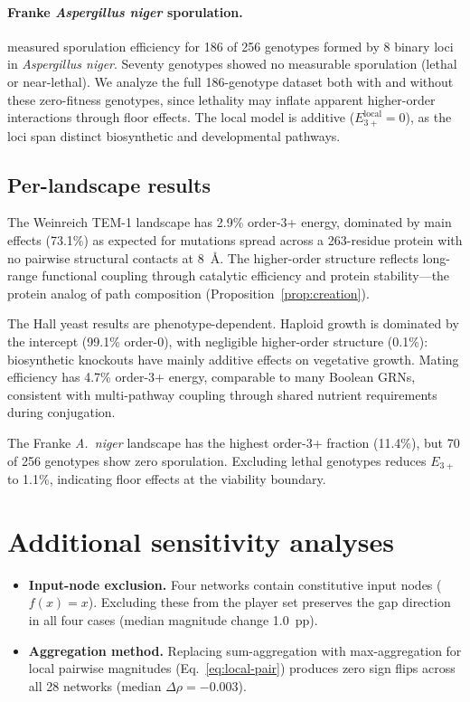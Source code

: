 \documentclass[10pt]{article}
\begin{document}
\paragraph{Franke \emph{Aspergillus niger} sporulation.}
\citet{franke2011evolutionary} measured sporulation efficiency for
186 of 256 genotypes formed by 8 binary loci in
\emph{Aspergillus niger}. Seventy genotypes showed no measurable
sporulation (lethal or near-lethal). We analyze the full 186-genotype
dataset both with and without these zero-fitness genotypes, since
lethality may inflate apparent higher-order interactions through
floor effects. The local model is additive
($E_{3+}^{\mathrm{local}} = 0$), as the loci span distinct
biosynthetic and developmental pathways.

\subsection*{Per-landscape results}

The Weinreich TEM-1 landscape has 2.9\% order-3+ energy, dominated
by main effects (73.1\%) as expected for mutations spread across a
263-residue protein with no pairwise structural contacts at 8~\AA.
The higher-order structure reflects long-range functional coupling
through catalytic efficiency and protein stability---the protein
analog of path composition (Proposition~\ref{prop:creation}).

The Hall yeast results are phenotype-dependent. Haploid growth is
dominated by the intercept (99.1\% order-0), with negligible
higher-order structure (0.1\%): biosynthetic knockouts have mainly
additive effects on vegetative growth. Mating efficiency has 4.7\%
order-3+ energy, comparable to many Boolean GRNs, consistent with
multi-pathway coupling through shared nutrient requirements during
conjugation.

The Franke \emph{A.~niger} landscape has the highest order-3+
fraction (11.4\%), but 70 of 256 genotypes show zero sporulation.
Excluding lethal genotypes reduces $E_{3+}$ to 1.1\%, indicating
floor effects at the viability boundary.


\section{Additional sensitivity analyses}
\label{supp:sensitivity}

\begin{itemize}
\item \textbf{Input-node exclusion.} Four networks contain
  constitutive input nodes ($f(x) = x$). Excluding these from the
  player set preserves the gap direction in all four cases (median
  magnitude change 1.0~pp).
\item \textbf{Aggregation method.} Replacing sum-aggregation with
  max-aggregation for local pairwise magnitudes
  (Eq.~\ref{eq:local-pair}) produces zero sign flips across all 28
  networks (median $\Delta\rho = -0.003$).
\end{itemize}
\end{document}
